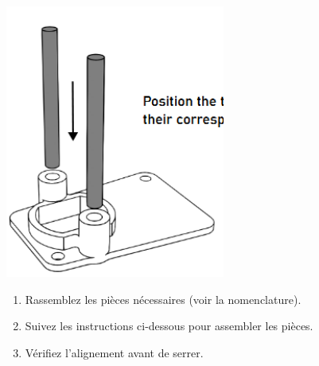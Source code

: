 \vspace{1em}

\begin{center}
    \includegraphics[height=9cm]{../images/step1_render.png}
\end{center}

\vspace{0.7em}

\begin{tcolorbox}[colback=gray!05, colframe=gray!60, boxrule=0.5pt, left=2mm, right=2mm, title=]
    \begin{enumerate}
        \item Rassemblez les pièces nécessaires (voir la nomenclature).
        \item Suivez les instructions ci-dessous pour assembler les pièces.
        \item Vérifiez l’alignement avant de serrer.
    \end{enumerate}
\end{tcolorbox}
